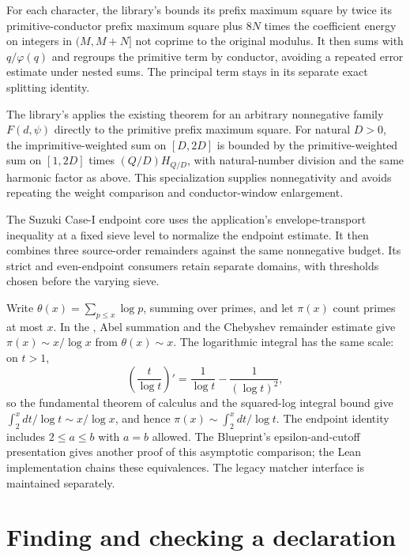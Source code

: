 For each character, the library's
bounds its prefix maximum square by twice its primitive-conductor prefix
maximum square plus $8N$ times the coefficient energy on integers in $(M,M+N]$ not
coprime to the original modulus. It then sums with $q/\varphi(q)$ and regroups
the primitive term by conductor, avoiding a repeated error estimate under
nested sums. The principal term stays in its separate exact splitting identity.

The library's 
applies the existing theorem for an arbitrary nonnegative family $F(d,\psi)$
directly to the primitive prefix maximum square. For natural $D>0$, the
imprimitive-weighted sum on $[D,2D]$ is bounded by the primitive-weighted sum
on $[1,2D]$ times $(Q/D)H_{Q/D}$, with natural-number division and the same
harmonic factor as above. This specialization supplies nonnegativity and
avoids repeating the weight comparison and conductor-window enlargement.

The Suzuki Case-I endpoint core uses the application's envelope-transport
inequality at a fixed sieve level to normalize the endpoint estimate. It then
combines three source-order remainders against the same nonnegative budget. Its strict and even-endpoint consumers retain separate
domains, with thresholds chosen before the varying sieve.

Write $\theta(x)=\sum_{p\le x}\log p$, summing over primes, and let $\pi(x)$
count primes at most $x$.
In the , Abel summation and the
Chebyshev remainder estimate give $\pi(x)\sim x/\log x$ from
$\theta(x)\sim x$. The logarithmic integral has the same scale: on $t>1$,
\[
  \left(\frac{t}{\log t}\right)'
    =\frac1{\log t}-\frac1{(\log t)^2},
\]
so the fundamental theorem of calculus and the squared-log integral bound give
$\int_2^x dt/\log t\sim x/\log x$, and hence
$\pi(x)\sim\int_2^x dt/\log t$. The endpoint identity includes $2\le a\le b$
with $a=b$ allowed. The Blueprint's epsilon-and-cutoff presentation gives
another proof of this asymptotic comparison; the Lean implementation chains
these equivalences. The legacy matcher interface is maintained separately.

\section{Finding and checking a declaration}

